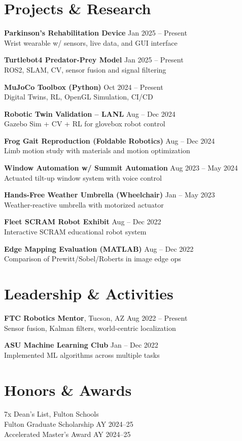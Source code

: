 \documentclass[11pt]{article}
\begin{document}
\section*{Projects \& Research}
\textbf{Parkinson’s Rehabilitation Device} \hfill Jan 2025 – Present \\
Wrist wearable w/ sensors, live data, and GUI interface

\textbf{Turtlebot4 Predator-Prey Model} \hfill Jan 2025 – Present \\
ROS2, SLAM, CV, sensor fusion and signal filtering

\textbf{MuJoCo Toolbox (Python)} \hfill Oct 2024 – Present \\
Digital Twins, RL, OpenGL Simulation, CI/CD

\textbf{Robotic Twin Validation – LANL} \hfill Aug – Dec 2024 \\
Gazebo Sim + CV + RL for glovebox robot control

\textbf{Frog Gait Reproduction (Foldable Robotics)} \hfill Aug – Dec 2024 \\
Limb motion study with materials and motion optimization

\textbf{Window Automation w/ Summit Automation} \hfill Aug 2023 – May 2024 \\
Actuated tilt-up window system with voice control

\textbf{Hands-Free Weather Umbrella (Wheelchair)} \hfill Jan – May 2023 \\
Weather-reactive umbrella with motorized actuator

\textbf{Fleet SCRAM Robot Exhibit} \hfill Aug – Dec 2022 \\
Interactive SCRAM educational robot system

\textbf{Edge Mapping Evaluation (MATLAB)} \hfill Aug – Dec 2022 \\
Comparison of Prewitt/Sobel/Roberts in image edge ops

\section*{Leadership \& Activities}
\textbf{FTC Robotics Mentor}, Tucson, AZ \hfill Aug 2022 – Present \\
Sensor fusion, Kalman filters, world-centric localization

\textbf{ASU Machine Learning Club} \hfill Jan – Dec 2022 \\
Implemented ML algorithms across multiple tasks

\section*{Honors \& Awards}
7x Dean’s List, Fulton Schools \\
Fulton Graduate Scholarship AY 2024–25 \\
Accelerated Master's Award AY 2024–25
\end{document}
